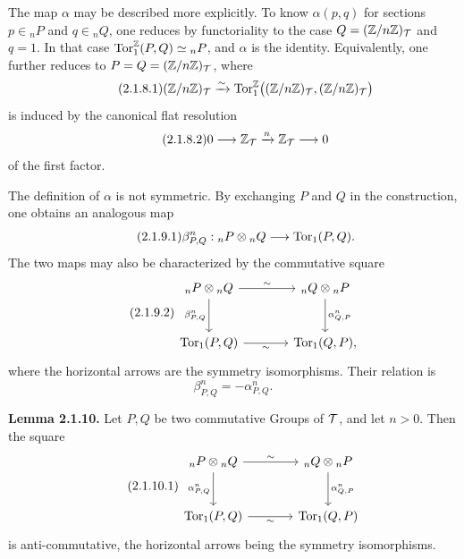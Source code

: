 \documentclass[11pt]{article}
\begin{document}
The map \(\alpha\) may be described more explicitly.  To know \(\alpha(p,q)\) for sections \(p\in{}_nP\) and \(q\in{}_nQ\), one reduces by functoriality to the case \(Q=(\mathbb Z/n\mathbb Z)_\mathcal T\) and \(q=1\).  In that case \(\operatorname{Tor}_1^{\mathbb Z}(P,Q)\simeq{}_nP\), and \(\alpha\) is the identity.  Equivalently, one further reduces to \(P=Q=(\mathbb Z/n\mathbb Z)_\mathcal T\), where
\begin{equation}\tag{2.1.8.1}
        (\mathbb Z/n\mathbb Z)_\mathcal T
        \xrightarrow{\sim}\operatorname{Tor}_1^{\mathbb Z}\bigl((\mathbb Z/n\mathbb Z)_\mathcal T,(\mathbb Z/n\mathbb Z)_\mathcal T\bigr)
\end{equation}
is induced by the canonical flat resolution
\begin{equation}\tag{2.1.8.2}
        0\longrightarrow\mathbb Z_\mathcal T\xrightarrow{n}\mathbb Z_\mathcal T\longrightarrow0
\end{equation}
of the first factor.

The definition of \(\alpha\) is not symmetric.  By exchanging \(P\) and \(Q\) in the construction, one obtains an analogous map
\begin{equation}\tag{2.1.9.1}
        \beta^n_{P,Q}:{}_nP\otimes{}_nQ\longrightarrow\operatorname{Tor}_1(P,Q).
\end{equation}
The two maps may also be characterized by the commutative square
\begin{equation}\tag{2.1.9.2}
\begin{tikzcd}[column sep=large,row sep=large]
{}_nP\otimes{}_nQ \arrow[r,"\sim"] \arrow[d,"\beta^n_{P,Q}"']
  & {}_nQ\otimes{}_nP \arrow[d,"\alpha^n_{Q,P}"]\\
\Torop_1(P,Q) \arrow[r,"\sim"'] & \Torop_1(Q,P),
\end{tikzcd}
\end{equation}
where the horizontal arrows are the symmetry isomorphisms.  Their relation is
\begin{equation}\tag{2.1.9.3}
        \beta^n_{P,Q}=-\alpha^n_{P,Q}.
\end{equation}

\textbf{Lemma 2.1.10.}  Let \(P,Q\) be two commutative Groups of \(\mathcal T\), and let \(n>0\).  Then the square
\begin{equation}\tag{2.1.10.1}
\begin{tikzcd}[column sep=large,row sep=large]
{}_nP\otimes{}_nQ \arrow[r,"\sim"] \arrow[d,"\alpha^n_{P,Q}"']
  & {}_nQ\otimes{}_nP \arrow[d,"\alpha^n_{Q,P}"]\\
\Torop_1(P,Q) \arrow[r,"\sim"'] & \Torop_1(Q,P)
\end{tikzcd}
\end{equation}
is anti-commutative, the horizontal arrows being the symmetry isomorphisms.
\end{document}

